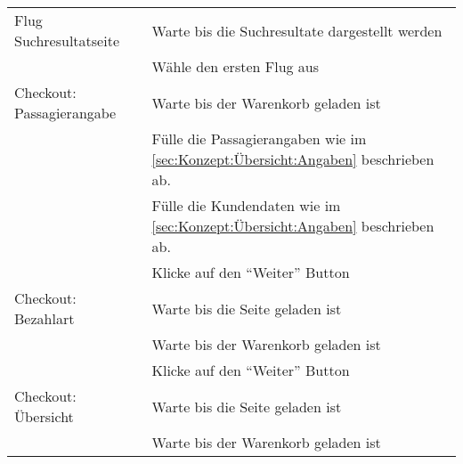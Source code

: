 \begin{table}[H]
\begin{tabularx}{0.9\textwidth}{ | l | X | }
		\multirow{1}{*}{Flug Suchresultatseite} & Warte bis die Suchresultate dargestellt werden \\ \cline{2-2}
		& Wähle den ersten Flug aus \\ \hline
		
		\multirow{1}{*}{Checkout: Passagierangabe} & Warte bis der Warenkorb geladen ist \\ \cline{2-2}
		& Fülle die Passagierangaben wie im \cref{sec:Konzept:Übersicht:Angaben} \nameref{sec:Konzept:Übersicht:Angaben} beschrieben ab. \\ \cline{2-2}
		& Fülle die Kundendaten wie im \cref{sec:Konzept:Übersicht:Angaben} \nameref{sec:Konzept:Übersicht:Angaben} beschrieben ab. \\ \cline{2-2}
		& Klicke auf den "`Weiter"' Button \\ \hline
		
		\multirow{1}{*}{Checkout: Bezahlart} & Warte bis die Seite geladen ist \\ \cline{2-2}
		& Warte bis der Warenkorb geladen ist \\ \cline{2-2}
		& Klicke auf den "`Weiter"' Button \\ \hline
		
		\multirow{1}{*}{Checkout: Übersicht} & Warte bis die Seite geladen ist \\ \cline{2-2}
		& Warte bis der Warenkorb geladen ist \\ \hline
	\end{tabularx} 
\end{table}


